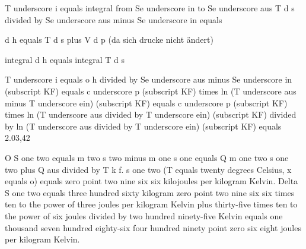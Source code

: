 T underscore i equals integral from Se underscore in to Se underscore aus T d s divided by Se underscore aus minus Se underscore in equals

d h equals T d s plus V d p (da sich drucke nicht ändert)

integral d h equals integral T d s

T underscore i equals o h divided by Se underscore aus minus Se underscore in (subscript KF) equals c underscore p (subscript KF) times ln (T underscore aus minus T underscore ein) (subscript KF) equals c underscore p (subscript KF) times ln (T underscore aus divided by T underscore ein) (subscript KF) divided by ln (T underscore aus divided by T underscore ein) (subscript KF) equals 2.03,42

O S one two equals m two s two minus m one s one equals Q m one two s one two plus Q aus divided by T k f. s one two (T equals twenty degrees Celsius, x equals o) equals zero point two nine six six kilojoules per kilogram Kelvin. Delta S one two equals three hundred sixty kilogram zero point two nine six six times ten to the power of three joules per kilogram Kelvin plus thirty-five times ten to the power of six joules divided by two hundred ninety-five Kelvin equals one thousand seven hundred eighty-six four hundred ninety point zero six eight joules per kilogram Kelvin.